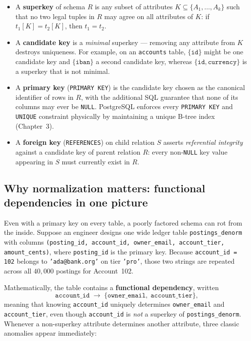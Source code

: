 \begin{itemize}
  \item A \textbf{superkey} of schema $R$ is any subset of attributes $K \subseteq \{A_1, \dots, A_k\}$ such that no two legal tuples in $R$ may agree on all attributes of $K$: if $t_1[K] = t_2[K]$, then $t_1 = t_2$.
  \item A \textbf{candidate key} is a \emph{minimal} superkey --- removing any attribute from $K$ destroys uniqueness. For example, on an \texttt{accounts} table, $\{\texttt{id}\}$ might be one candidate key and $\{\texttt{iban}\}$ a second candidate key, whereas $\{\texttt{id}, \texttt{currency}\}$ is a superkey that is not minimal.
  \item A \textbf{primary key} (\texttt{PRIMARY KEY}) is the candidate key chosen as the canonical identifier of rows in $R$, with the additional SQL guarantee that none of its columns may ever be \texttt{NULL}. PostgreSQL enforces every \texttt{PRIMARY KEY} and \texttt{UNIQUE} constraint physically by maintaining a unique B-tree index (Chapter~3).
  \item A \textbf{foreign key} (\texttt{REFERENCES}) on child relation $S$ asserts \emph{referential integrity} against a candidate key of parent relation $R$: every non-\texttt{NULL} key value appearing in $S$ must currently exist in $R$.
\end{itemize}

\subsection{Why normalization matters: functional dependencies in one picture}

Even with a primary key on every table, a poorly factored schema can rot from the inside. Suppose an engineer designs one wide ledger table \texttt{postings\_denorm} with columns \texttt{(posting\_id, account\_id, owner\_email, account\_tier, amount\_cents)}, where \texttt{posting\_id} is the primary key. Because \texttt{account\_id = 102} belongs to \texttt{'ada@bank.org'} on tier \texttt{'pro'}, those two strings are repeated across all $40{,}000$ postings for Account~102.

Mathematically, the table contains a \textbf{functional dependency}, written
\[
  \texttt{account\_id} \;\to\; \{\texttt{owner\_email},\; \texttt{account\_tier}\},
\]
meaning that knowing \texttt{account\_id} uniquely determines \texttt{owner\_email} and \texttt{account\_tier}, even though \texttt{account\_id} is \emph{not} a superkey of \texttt{postings\_denorm}. Whenever a non-superkey attribute determines another attribute, three classic anomalies appear immediately:

